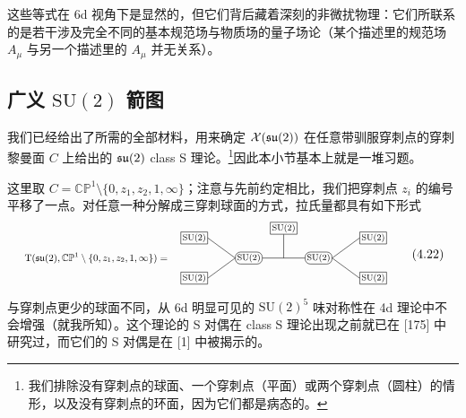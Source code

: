 这些等式在 6d 视角下是显然的，但它们背后藏着深刻的非微扰物理：它们所联系的是若干涉及完全不同的基本规范场与物质场的量子场论（某个描述里的规范场 $A_\mu$ 与另一个描述里的 $A_\mu$ 并无关系）。



\subsection{广义 $\mathrm{SU}(2)$ 箭图}

我们已经给出了所需的全部材料，用来确定 $\mathcal{X}(\mathfrak{su}(2))$ 在任意带驯服穿刺点的穿刺黎曼面 $C$ 上给出的 $\mathfrak{su}(2)$ class S 理论。\footnote{我们排除没有穿刺点的球面、一个穿刺点（平面）或两个穿刺点（圆柱）的情形，以及没有穿刺点的环面，因为它们都是病态的。}因此本小节基本上就是一堆习题。

 这里取 $C=\mathbb{CP}^1\setminus\{0,z_1,z_2,1,\infty\}$；注意与先前约定相比，我们把穿刺点 $z_i$ 的编号平移了一点。对任意一种分解成三穿刺球面的方式，拉氏量都具有如下形式
\begin{equation}
\begin{tikzpicture}[baseline=(G1.center),scale=0.85,transform shape,
  fl/.style={draw,rectangle,inner sep=1.6pt,font=\footnotesize},
  ga/.style={draw,rounded corners=4pt,inner sep=1.6pt,font=\footnotesize}]
  \node[font=\small,anchor=east] at (-1.35,0) {$\mathrm{T}(\fsu(2),\mathbb{CP}^1\setminus\{0,z_1,z_2,1,\infty\})=$};
  \node[ga] (G1) at (1.2,0) {$\mathrm{SU}(2)$};
  \node[ga] (G2) at (3.5,0) {$\mathrm{SU}(2)$};
  \node[fl] (A) at (-0.6,0.66) {$\mathrm{SU}(2)$};
  \node[fl] (B) at (-0.6,-0.66){$\mathrm{SU}(2)$};
  \node[fl] (M) at (2.35,0.98) {$\mathrm{SU}(2)$};
  \node[fl] (D) at (5.3,0.66) {$\mathrm{SU}(2)$};
  \node[fl] (E) at (5.3,-0.66){$\mathrm{SU}(2)$};
  \draw (A.east) -- (G1.west);
  \draw (B.east) -- (G1.west);
  \draw (G1.east) -- (G2.west);
  \draw (M.south) -- (2.35,0);
  \draw (G2.east) -- (D.west);
  \draw (G2.east) -- (E.west);
\end{tikzpicture}
  \tag{4.22}
\end{equation}

与穿刺点更少的球面不同，从 6d 明显可见的 $\mathrm{SU}(2)^5$ 味对称性在 4d 理论中不会增强（就我所知）。这个理论的 S 对偶在 class S 理论出现之前就已在 [175] 中研究过，而它们的 S 对偶是在 [1] 中被揭示的。

